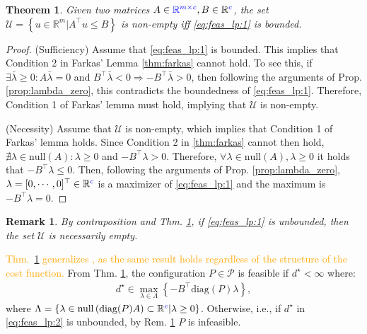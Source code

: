 \documentclass[letterpaper, 10 pt, conference]{ieeeconf}  %
\newtheorem{theorem}{\textbf{Theorem}}
\newtheorem{remark}{\textbf{Remark}}
\begin{document}
\begin{theorem}\label{thm:feas_lp_farkas}
    Given two matrices $A\in{\color{blue}\mathbb{R}^{m\times c}},B\in\mathbb{R}{\color{blue}^c}$, the set $\mathcal{U} = \left\{u\in\mathbb{R}^m | A^\top u \leq B \right\}$ is non-empty iff \eqref{eq:feas_lp:1} is bounded. 
\end{theorem}
\begin{proof} 
    (Sufficiency) Assume that \eqref{eq:feas_lp:1} is bounded. This implies that Condition 2 in Farkas' Lemma \ref{thm:farkas} cannot hold. To see this, if $\exists \bar{\lambda} \geq 0 : A\bar{\lambda} =0 $ and $B^\top \bar{\lambda} < 0 \Rightarrow-B^\top \bar{\lambda} > 0$, then following the arguments of Prop. \ref{prop:lambda_zero}, this contradicts the boundedness of \eqref{eq:feas_lp:1}. Therefore, Condition 1 of Farkas' lemma must hold, implying that $\mathcal{U}$ is non-empty.
    \par 
    (Necessity) Assume that $\mathcal{U}$ is non-empty, which implies that Condition 1 of Farkas' lemma holds. Since Condition 2 in \ref{thm:farkas} cannot then hold, $\nexists \lambda \in \textrm{null}(A) : \lambda \geq 0$ and $-B^\top \lambda > 0$. Therefore, $\forall \lambda \in \textrm{null}(A), \lambda \geq 0$ it holds that $-B^\top \lambda \leq  0$. Then, following the arguments of Prop. \ref{prop:lambda_zero},  $\lambda = [0,\cdots,0]^\top \in \mathbb{R}{\color{blue}^c}$ is a {\color{blue}maximizer} of \eqref{eq:feas_lp:1} and the maximum is $-B^\top \lambda  =  0$. 
\end{proof}
\begin{remark}\label{rem:feas_lp:contra}
    By contraposition and Thm. \ref{thm:feas_lp_farkas}, if \eqref{eq:feas_lp:1} is unbounded, then the set $\mathcal{U}$ is necessarily empty.
\end{remark}
\textcolor{orange}{Thm.~\ref{thm:feas_lp_farkas} generalizes \cite[Thm.~1]{rousseas2025feasibilityevaluationquadraticprograms}, as the same result holds regardless of the structure of the cost function.} From Thm. \ref{thm:feas_lp_farkas}, the configuration $P\in\mathcal{P}$ is feasible if {\color{blue}$d^\star<\infty$ where}:
\begin{equation}\label{eq:feas_lp:2}
    \begin{split}
        d^\star \in \underset{\lambda\in\Lambda}{\max}
        \left\{
            -B^\top \textrm{diag}(P)\lambda 
        \right\},        
    \end{split}
\end{equation}
where 
$\Lambda = 
    \left\{ 
        \lambda \in \textrm{null}\left( \textrm{diag}(P)A\right) \subset \mathbb{R}{\color{blue}^c} 
        |
        \lambda \geq 0
\right\}$.
Otherwise, i.e., if {\color{blue}$d^\star$ in} \eqref{eq:feas_lp:2} is unbounded,  by Rem. \ref{rem:feas_lp:contra} $P$ is infeasible.
\end{document}
